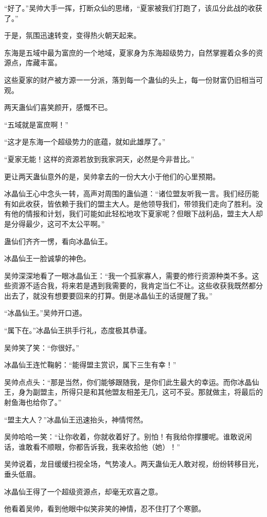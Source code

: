 \begin{this_body}
“好了。”吴帅大手一挥，打断众仙的思绪，“夏家被我们打跑了，该瓜分此战的收获了。”

于是，氛围迅速转变，变得热火朝天起来。

东海是五域中最为富庶的一个地域，夏家身为东海超级势力，自然掌握着众多的资源点，库藏丰富。

这些夏家的财产被方源一一分派，落到每一个蛊仙的头上，每一份财富仍旧相当可观。

两天蛊仙们喜笑颜开，感慨不已。

“五域就是富庶啊！”

“这才是东海一个超级势力的底蕴，就如此雄厚了。”

“夏家无能！这样的资源若放到我家洞天，必然是今非昔比。”

更让两天蛊仙意外的是，吴帅拿去的一份大大小于他们的心里预期。

冰晶仙王心中念头一转，高声对周围的蛊仙道：“诸位盟友听我一言。我们经历能有如此收获，皆依赖于我们的盟主大人。是他领导我们，带领我们走向了胜利。没有他的情报和计划，我们可能如此轻松地攻下夏家呢？但眼下战利品，盟主大人却是分得最少，这可不太公平啊。”

蛊仙们齐齐一愣，看向冰晶仙王。

冰晶仙王一脸诚挚的神色。

吴帅深深地看了一眼冰晶仙王：“我一个孤家寡人，需要的修行资源种类不多。这些资源不适合我，将来若是遇到我需要的，我肯定当仁不让。这些收获我既然都分出去了，就没有想要要回来的打算。倒是冰晶仙王的话提醒了我。”

“冰晶仙王。”吴帅开口道。

“属下在。”冰晶仙王拱手行礼，态度极其恭谨。

吴帅笑了笑：“你很好。”

冰晶仙王连忙鞠躬：“能得盟主赏识，属下三生有幸！”

吴帅点点头：“那是当然，你们能够跟随我，是你们此生最大的幸运。而你冰晶仙王，身为副盟主，所得只是和其他盟友相差无几，这可不妥。那就做主，将最后的射鱼海也给你了。”

“盟主大人？”冰晶仙王迅速抬头，神情愕然。

吴帅哈哈一笑：“让你收着，你就收着好了。别怕！有我给你撑腰呢。谁敢说闲话，谁敢看不顺眼，你都告诉我，我来收拾他（她）！”

吴帅说着，龙目缓缓扫视全场，气势凌人。两天蛊仙无人敢对视，纷纷转移目光，垂头低眉。

冰晶仙王得了一个超级资源点，却毫无欢喜之意。

他看着吴帅，看到他眼中似笑非笑的神情，忍不住打了个寒颤。


\end{this_body}

